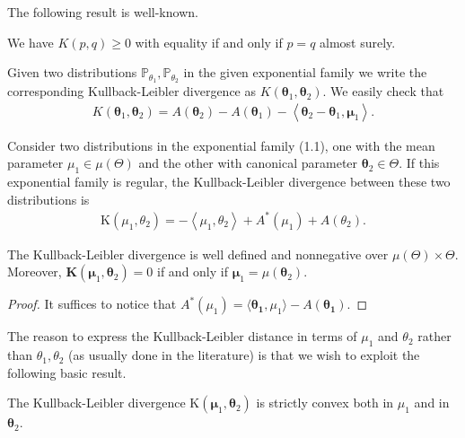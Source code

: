 The following result is well-known.
\begin{prop}
    We have $K(p, q) \geq 0$ with equality if and only if $p=q$ almost surely.
\end{prop}



Given two distributions $\mathbb{P}_{\theta_1}, \mathbb{P}_{\theta_2}$ in the given exponential family we write the corresponding Kullback-Leibler divergence as $K\left(\boldsymbol{\theta}_1, \boldsymbol{\theta}_2\right)$. We easily check that
\begin{align*}
K\left(\boldsymbol{\theta}_1, \boldsymbol{\theta}_2\right)=A\left(\boldsymbol{\theta}_2\right)-A\left(\boldsymbol{\theta}_1\right)-\left\langle\boldsymbol{\theta}_2-\boldsymbol{\theta}_1, \boldsymbol{\mu}_1\right\rangle .
\end{align*}

\begin{prop}
    Consider two distributions in the exponential family (1.1), one with the mean parameter $\mu_1 \in \mu(\Theta)$ and the other with canonical parameter $\boldsymbol{\theta}_2 \in \Theta$. If this exponential family is regular, the Kullback-Leibler divergence between these two distributions is
\begin{align*}
\mathrm{K}\left(\mu_1, \theta_2\right)=-\left\langle\mu_1, \theta_2\right\rangle+A^*\left(\mu_1\right)+A\left(\theta_2\right) .
\end{align*}


The Kullback-Leibler divergence is well defined and nonnegative over $\mu(\Theta) \times \Theta$. Moreover, $\boldsymbol{K}\left(\boldsymbol{\mu}_1, \boldsymbol{\theta}_2\right)=0$ if and only if $\boldsymbol{\mu}_1=\mu\left(\boldsymbol{\theta}_2\right)$.
\end{prop}

\begin{proof}
    It suffices to notice that $A^*(\mu_1)=\langle \boldsymbol{\theta_1},\mu_1\rangle-A(\boldsymbol{\theta_1})$.
\end{proof}

The reason to express the Kullback-Leibler distance in terms of $\mu_1$ and $\theta_2$ rather than $\theta_1, \theta_2$ (as usually done in the literature) is that we wish to exploit the following basic result.
\begin{prop}
    The Kullback-Leibler divergence $\mathrm{K}\left(\boldsymbol{\mu}_1, \boldsymbol{\theta}_2\right)$ is strictly convex both in $\mu_1$ and in $\boldsymbol{\theta}_2$.
\end{prop}

